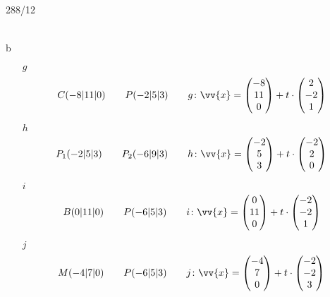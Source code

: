\begin{exercise}{288/12}
\begin{itemize}
\begin{gather*}
    \end{gather*}
  \end{itemize}
  \item [b]
  \begin{itemize}
    \item [$g$]
    \begin{gather*}
      C(-8|11|0) \qquad P(-2|5|3) \qquad g \colon \vv{x} = \begin{pmatrix}-8 \\ 11 \\ 0\end{pmatrix} + t \cdot \begin{pmatrix}2 \\ -2 \\ 1\end{pmatrix}
    \end{gather*}
    \item [$h$]
    \begin{gather*}
      P_1(-2|5|3) \qquad P_2(-6|9|3) \qquad h \colon \vv{x} = \begin{pmatrix}-2 \\ 5 \\ 3\end{pmatrix} + t \cdot \begin{pmatrix}-2 \\ 2 \\ 0\end{pmatrix}
    \end{gather*}
    \item [$i$]
    \begin{gather*}
      B(0|11|0) \qquad P(-6|5|3) \qquad i \colon \vv{x} = \begin{pmatrix}0 \\ 11 \\ 0\end{pmatrix} + t \cdot \begin{pmatrix}-2 \\ -2 \\ 1\end{pmatrix}
    \end{gather*}
    \item [$j$]
    \begin{gather*}
      M(-4|7|0) \qquad P(-6|5|3) \qquad j \colon \vv{x} = \begin{pmatrix}-4 \\ 7 \\ 0\end{pmatrix} + t \cdot \begin{pmatrix}-2 \\ -2 \\ 3\end{pmatrix}
    \end{gather*}
  \end{itemize}
\end{exercise}
